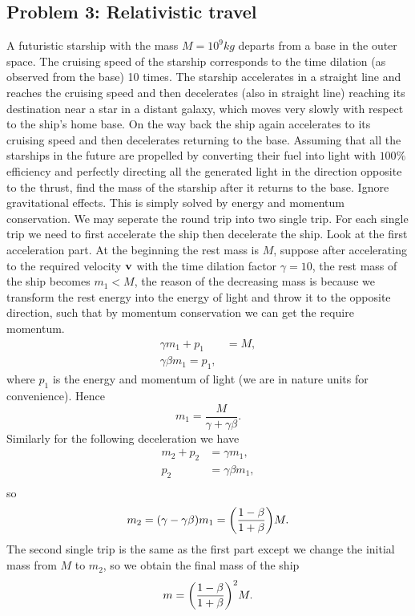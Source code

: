 \documentclass[10pt]{article}
\begin{document}
\subsection{Problem 3: Relativistic travel}
A futuristic starship with the mass $M = 10^9 \si{kg}$ departs from a base in the outer space. The cruising speed of the starship corresponds to the time dilation (as observed from the base) 10 times. 
The starship accelerates in a straight line and reaches the cruising speed and then decelerates (also in straight line) reaching its destination near a star in a distant galaxy, which moves very slowly with respect to the ship’s home base. 
On the way back the ship again accelerates to its cruising speed and then decelerates returning to the base. Assuming that all the starships in the future are propelled by converting their fuel into light with $100\%$ efficiency and perfectly directing all the generated light in the direction opposite to the thrust, find the mass of the starship after it returns to the base. Ignore gravitational effects.
This is simply solved by energy and momentum conservation. We may seperate the round trip into two single trip. For each single trip we need to first accelerate the ship then decelerate the ship. Look at the first acceleration part. At the beginning the rest mass is $M$, suppose after accelerating to the required velocity $\vb{v}$ with the time dilation factor $\gamma = 10$, the rest mass of the ship becomes  $m_1 < M$, the reason of the decreasing mass is because we transform the rest energy into the energy of light and throw it to the opposite direction, such that by momentum conservation we can get the require momentum. 
\begin{align}
	\gamma m_1 + p_1 &= M, \\
	\gamma \beta m_1 = p_1,
\end{align}
where $p_1$ is the energy and momentum of light (we are in nature units for convenience). Hence 
\begin{equation}
	m_1 = \frac{M}{\gamma + \gamma \beta}.
\end{equation}
Similarly for the following deceleration we have 
\begin{align}
	m_2 + p_2 &= \gamma m_1, \\
	p_2 &= \gamma \beta m_1, \\
\end{align}
so 
\begin{equation}
	m_2 = (\gamma - \gamma \beta) m_1 = \qty(\frac{1-\beta}{1+\beta}) M. 
\end{equation}
The second single trip is the same as the first part except we change the initial mass from $M$ to $m_2$, so we obtain the final mass of the ship 
\begin{equation}
	m = \qty(\frac{1-\beta}{1+\beta})^2 M.
\end{equation}
\end{document}
